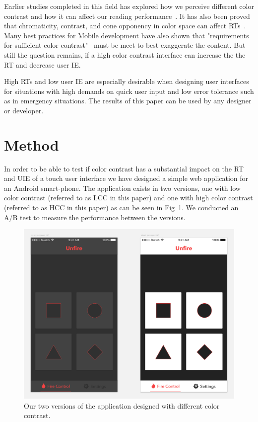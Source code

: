 \documentclass[runningheads,a4paper]{llncs}
\begin{document}
Earlier studies completed in this field has explored how we perceive different color contrast and how it can affect our reading performance~\cite{wu2003improving}. It has also been proved that chromaticity, contrast, and cone opponency in color space can affect RTs~\cite{mckeefry2003simple}. Many best practices for Mobile development have also shown that "requirements for sufficient color contrast"~\cite{marcus2013design} must be meet to best exaggerate the content. But still the question remains, if a high color contrast interface can increase the the RT and decrease user IE.

High RTs and low user IE are especially desirable when designing user interfaces for situations with high demands on quick user input and low error tolerance such as in emergency situations. The results of this paper can be used by any designer or developer.

\section{Method}
In order to be able to test if color contrast has a substantial impact on the RT and UIE of a touch user interface we have designed a simple web application for an Android smart-phone. The application exists in two versions, one with low color contrast (referred to as LCC in this paper) and one with high color contrast (referred to as HCC in this paper) as can be seen in Fig~\ref{fig:application}. We conducted an A/B test to measure the performance between the versions.

\begin{figure}
	\centering
	\includegraphics[width=\textwidth]{application}
	\caption{Our two versions of the application designed with different color contrast.
	\label{fig:application}}
\end{figure}
\end{document}
